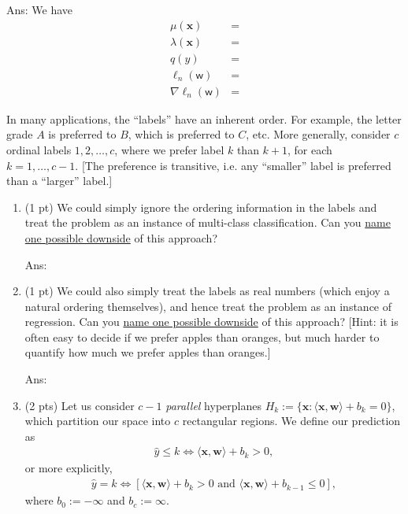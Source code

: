 \documentclass[10pt,letter,notitlepage]{article}
\newcommand{\wv}{\mathbf{w}}
\newcommand{\xv}{\mathbf{x}}
\newcommand{\inner}[2]{\langle #1, #2 \rangle}
\newcommand{\wbs}{\bm{\mathsf{w}}}
\newcommand{\ie}{{i.e.}\xspace}
\newcommand{\etc}{{etc.}\xspace}
\newcommand{\ans}[1]{{\color{orange}\textsf{Ans}: #1}}
\begin{document}
\begin{exercise}
\begin{enumerate}
\ans{
We have 
\begin{align}
\mu(\xv) &=  \\
\lambda(\xv) &= \\
q(y) &= \\
\ell_n(\wbs) &= \\
\nabla\ell_n(\wbs) &=
\end{align}
}	
	
\end{enumerate}
\end{exercise}


\begin{exercise}
In many applications, the ``labels'' have an inherent order. For example, the letter grade $A$ is preferred to $B$, which is preferred to $C$, \etc More generally, consider $c$ ordinal labels $1, 2, \ldots, c$, where we prefer label $k$ than $k+1$, for each $k=1, \ldots, c-1$. [The preference is transitive, \ie any ``smaller'' label is preferred than a ``larger'' label.]

\begin{enumerate}
\item (1 pt) We could simply ignore the ordering information in the labels and treat the problem as an instance of multi-class classification. Can you \uline{name one possible downside} of this approach?

\ans{\vskip2cm}

\item (1 pt) We could also simply treat the labels as real numbers (which enjoy a natural ordering themselves), and hence treat the problem as an instance of regression. Can you \uline{name one possible downside} of this approach? [Hint: it is often easy to decide if we prefer apples than oranges, but much harder to quantify how much we prefer apples than oranges.] 

\ans{\vskip2cm}

\item (2 pts) Let us consider $c-1$ \emph{parallel} hyperplanes 
$H_k := \{\xv : \inner{\xv}{\wv} + b_k = 0 \}$, which partition our space into $c$ rectangular regions. We define our prediction as 
\begin{align}
\hat y \leq k \iff \inner{\xv}{\wv} + b_{k} > 0, 
\end{align}
or more explicitly, 
\begin{align}
\hat y = k \iff [\inner{\xv}{\wv} + b_{k} > 0 \mbox{ and } \inner{\xv}{\wv} + b_{k-1} \leq 0 ],
\end{align}
where $b_0 := -\infty$ and $b_c := \infty$.
	

\end{enumerate}
\end{exercise}
\end{document}

